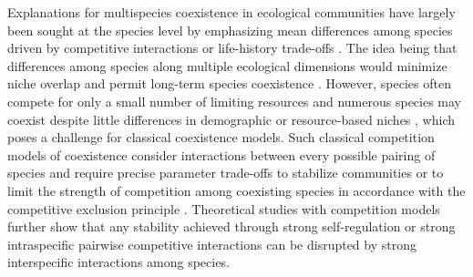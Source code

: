 \documentclass[11pt]{article}
\begin{document}
Explanations for multispecies coexistence in ecological communities have largely been sought at the species level by emphasizing mean differences among species driven by competitive interactions or life-history trade-offs \citep{gravel_species_2011,violle_towards_2009,clark_high-dimensional_2010,kraft_plant_2015,valladares_species_2015}. The idea being that differences among species along multiple ecological dimensions would minimize niche overlap and permit long-term species coexistence \citep{barabas_effect_2016}. However, species often compete for only a small number of limiting resources 
\citep{hutchinson_paradox_1961,laird_competitive_2006, li_effects_2016-1,shoresh_evolution_2008, letten_mechanistic_2019}  and numerous species may coexist despite little differences in demographic or resource-based niches \citep{condit_importance_2006}, which poses a challenge for classical coexistence models. Such classical competition models of coexistence consider interactions between every possible pairing of species and require precise parameter
trade-offs to stabilize communities or to limit the strength of competition among coexisting species in accordance with the competitive exclusion principle 
 \citep{barabas_continuous_2012}. Theoretical studies with competition models further show that any stability achieved through strong self-regulation or strong intraspecific pairwise competitive interactions \citep{barabas_self-regulation_2017} can be disrupted by strong interspecific interactions among species. 
\end{document}
